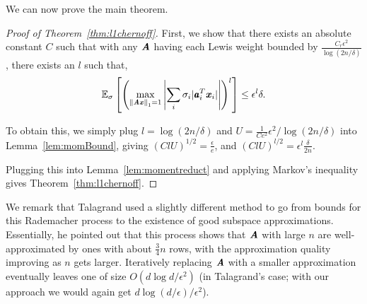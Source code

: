 We can now prove the main theorem.

\begin{proof}[Proof of Theorem~\ref{thm:l1chernoff}]
First, we show that there exists an absolute constant $C$ such that with any $\AA$ having each Lewis weight
bounded by $\frac{C_r \epsilon^2}{\log(2n/\delta)}$, there exists an $l$ such that,
\begin{equation*}
\expec{\sigma}{\left (\max_{\norm{\AA \xx}_1 = 1} \left | \sum_i \sigma_i |\aa_i^T \xx_i| \right | \right )^l} \leq \epsilon^l \delta.
\end{equation*}

To obtain this, we simply plug $l = \log(2n/\delta)$ and $U = \frac{1}{Ce^2} \epsilon^2 / \log(2n / \delta)$ into
Lemma~\ref{lem:momBound}, giving $(ClU)^{1/2} = \frac{\epsilon}{e}$,
and $(ClU)^{l/2} = \epsilon^l \frac{\delta}{2n}$.

Plugging this into Lemma~\ref{lem:momentreduct} and applying Markov's inequality gives Theorem~\ref{thm:l1chernoff}.
\end{proof}

We remark that Talagrand used a slightly different method to go from bounds for this Rademacher process to
the existence of good subspace approximations.  Essentially, he pointed out that this process shows that
$\AA$ with large $n$ are well-approximated by ones with about $\frac{3}{4} n$ rows, with the approximation
quality improving as $n$ gets larger.  Iteratively replacing $\AA$ with a smaller approximation eventually leaves
one of size $O(d \log d / \epsilon^2)$ (in Talagrand's case; with our approach we would again get $d \log(d/\epsilon) / \epsilon^2$).
